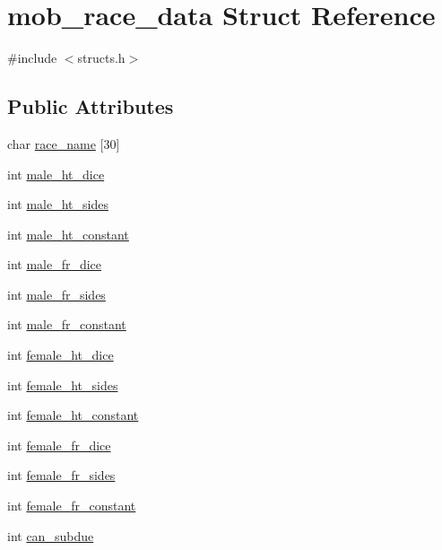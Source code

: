 \hypertarget{structmob__race__data}{\section{mob\-\_\-race\-\_\-data Struct Reference}
\label{structmob__race__data}
}


{\ttfamily \#include $<$structs.\-h$>$}

\subsection*{Public Attributes}
\begin{DoxyCompactItemize}
\item 
char \hyperlink{structmob__race__data_a389ae9d25a4f59ffc2d555e3825c1112}{race\-\_\-name} \mbox{[}30\mbox{]}
\item 
int \hyperlink{structmob__race__data_a88171ad1cb0131ae9bbae343d269b112}{male\-\_\-ht\-\_\-dice}
\item 
int \hyperlink{structmob__race__data_a9c4eee82a50cd13b77971e8d387c9428}{male\-\_\-ht\-\_\-sides}
\item 
int \hyperlink{structmob__race__data_a6cfd42468d5720c6b88e087ccee14bca}{male\-\_\-ht\-\_\-constant}
\item 
int \hyperlink{structmob__race__data_a30553ff8d46edbbd89734fca88c861f1}{male\-\_\-fr\-\_\-dice}
\item 
int \hyperlink{structmob__race__data_a68e393a968e237a812efe0dc37fde044}{male\-\_\-fr\-\_\-sides}
\item 
int \hyperlink{structmob__race__data_a4ae41526756f801e71c7036fc85df140}{male\-\_\-fr\-\_\-constant}
\item 
int \hyperlink{structmob__race__data_adb01713c5978032ff72334dff4c27f13}{female\-\_\-ht\-\_\-dice}
\item 
int \hyperlink{structmob__race__data_ac43aef59dbadbb72b5536877a9efc8e0}{female\-\_\-ht\-\_\-sides}
\item 
int \hyperlink{structmob__race__data_adc112416f42013440afcac7cb8910fe0}{female\-\_\-ht\-\_\-constant}
\item 
int \hyperlink{structmob__race__data_a5cd750f3726e8acabb36aad63071efcb}{female\-\_\-fr\-\_\-dice}
\item 
int \hyperlink{structmob__race__data_a703e31001163250eda29eeafe87c7e89}{female\-\_\-fr\-\_\-sides}
\item 
int \hyperlink{structmob__race__data_a2ceca6988142b9598a1170fa014af2eb}{female\-\_\-fr\-\_\-constant}
\item 
int \hyperlink{structmob__race__data_a5144d6842862b73c79a15994a3734429}{can\-\_\-subdue}
\end{DoxyCompactItemize}


